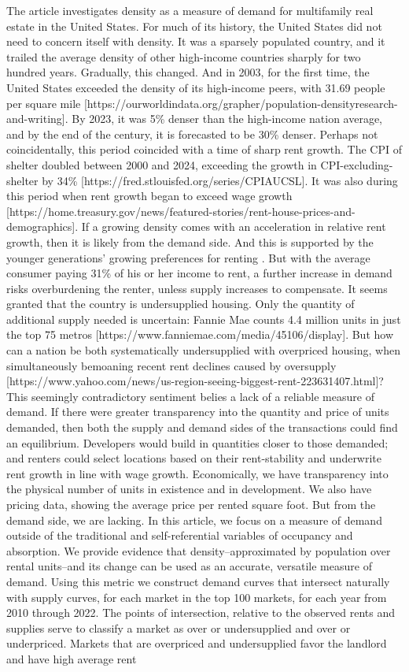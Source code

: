 \documentclass[sn-mathphys-num]{sn-jnl}%
\theoremstyle{thmstyleone}%
\theoremstyle{thmstyletwo}%
\theoremstyle{thmstylethree}%
\begin{document}
The article investigates density as a measure of demand for multifamily real estate in the United States. For much of its history, the United States did not need to concern itself with density. It was a sparsely populated country, and it trailed the average density of other high-income countries sharply for two hundred years. Gradually, this changed. And in 2003, for the first time, the United States exceeded the density of its high-income peers, with 31.69 people per square mile [https://ourworldindata.org/grapher/population-densityresearch-and-writing]. By 2023, it was 5\% denser than the high-income nation average, and by the end of the century, it is forecasted to be 30\% denser. Perhaps not coincidentally, this period coincided with a time of sharp rent growth. The CPI of shelter doubled between 2000 and 2024, exceeding the growth in CPI-excluding-shelter by 34\% [https://fred.stlouisfed.org/series/CPIAUCSL]. It was also during this period when rent growth began to exceed wage growth [https://home.treasury.gov/news/featured-stories/rent-house-prices-and-demographics]. If a growing density comes with an acceleration in relative rent growth, then it is likely from the demand side. And this is supported by the younger generations' growing preferences for renting \cite{fanniemaeConsumersFeeling}. But with the average consumer paying 31\% \cite{censusNearlyHalf} of his or her income to rent, a further increase in demand risks overburdening the renter, unless supply increases to compensate. It seems granted that the country is undersupplied housing. Only the quantity of additional supply needed is uncertain: Fannie Mae counts 4.4 million units in just the top 75 metros [https://www.fanniemae.com/media/45106/display]. But how can a nation be both systematically undersupplied  with overpriced housing, when simultaneously bemoaning recent rent declines caused by oversupply [https://www.yahoo.com/news/us-region-seeing-biggest-rent-223631407.html]? This seemingly contradictory sentiment belies a lack of a reliable measure of demand. If there were greater transparency into the quantity and price of units demanded, then both the supply and demand sides of the transactions could find an equilibrium. Developers would build in quantities closer to those demanded; and renters could select locations based on their rent-stability and underwrite rent growth in line with wage growth. Economically, we have transparency into the physical number of units in existence and in development. We also have pricing data, showing the average price per rented square foot. But from the demand side, we are lacking. In this article, we focus on a measure of demand outside of the traditional and self-referential variables of occupancy and absorption. We provide evidence that density--approximated by population over rental units--and its change can be used as an accurate, versatile measure of demand. Using this metric we construct demand curves that intersect naturally with supply curves, for each market in the top 100 markets, for each year from 2010 through 2022. The points of intersection, relative to the observed rents and supplies serve to classify a market as over or undersupplied and over or underpriced. Markets that are overpriced and undersupplied favor the landlord and have high average rent 
\end{document}
